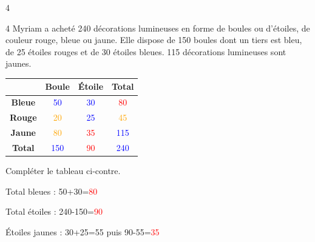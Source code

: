 \documentclass[a4paper]{book}
\begin{document}
{\begin{exerciceNote}{4}
        \begin{center}
        \end{center}
    \end{exerciceNote}


    \begin{exerciceNote}{4}
        Myriam a acheté 240 décorations lumineuses en forme de boules ou d'étoiles, de couleur rouge, bleue ou jaune. Elle dispose de 150 boules dont un tiers est bleu, de 25 étoiles rouges et de 30 étoiles bleues. 115 décorations lumineuses sont jaunes. 

        \medskip

        \begin{minipage}{0.5\linewidth}
            \begin{center}
                \begin{tabular}{|c|c|c|c|}
                    \hline
                     & \textbf{Boule} & \textbf{Étoile} & \textbf{Total} \\
                    \hline
                    \textbf{Bleue} & 
                    \textcolor{blue}{50} & \textcolor{blue}{30} & \textcolor{red}{80} \\
                    \hline
                    \textbf{Rouge} & 
                    \textcolor{orange}{20} & \textcolor{blue}{25} & \textcolor{orange}{45} \\
                    \hline
                    \textbf{Jaune} & 
                    \textcolor{orange}{80} & \textcolor{red}{35} & \textcolor{blue}{115} \\
                    \hline
                    \textbf{Total} & 
                    \textcolor{blue}{150} & \textcolor{red}{90} & \textcolor{blue}{240}\\
                    \hline
                \end{tabular}
            \end{center}
        \end{minipage}
        \hfill
        \begin{minipage}{0.49\linewidth}
            Compléter le tableau ci-contre. 
 
            Total bleues : 50+30=\textcolor{red}{80}   

            Total étoiles : 240-150=\textcolor{red}{90}

            Étoiles jaunes : 30+25=55 puis 90-55=\textcolor{red}{35}


\end{minipage}
\end{exerciceNote}}
\end{document}

